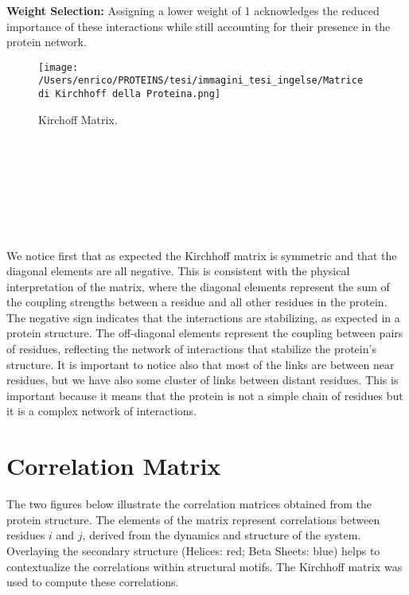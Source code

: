 \documentclass[English, Lau, oneside]{sapthesis}
\begin{document}
\textbf{Weight Selection:} Assigning a lower weight of 1 acknowledges the reduced importance of these interactions while still accounting for their presence in the protein network.
\begin{figure}[h!]
    \centering
    \texttt{[image: /Users/enrico/PROTEINS/tesi/immagini\_tesi\_ingelse/Matrice di Kirchhoff della Proteina.png]}
    \caption{Kirchoff Matrix.}
\end{figure}
\\\\\\\\\\\\\\

We notice first that as expected the Kirchhoff matrix is symmetric and that the diagonal elements are all negative. This is consistent with the physical interpretation of the matrix, where the diagonal elements represent the sum of the coupling strengths between a residue and all other residues in the protein. The negative sign indicates that the interactions are stabilizing, as expected in a protein structure. The off-diagonal elements represent the coupling between pairs of residues, reflecting the network of interactions that stabilize the protein's structure.
It is important to notice also that most of the links are between near residues, but we have also some cluster of links between distant residues. This is important because it means that the protein is not a simple chain of residues but it is a complex network of interactions.
\newpage



\section*{Correlation Matrix}
\noindent The two figures below illustrate the correlation matrices obtained from the protein structure. The elements of the matrix represent correlations between residues \(i\) and \(j\), derived from the dynamics and structure of the system. Overlaying the secondary structure (Helices: red; Beta Sheets: blue) helps to contextualize the correlations within structural motifs. The Kirchhoff matrix was used to compute these correlations.
\end{document}
